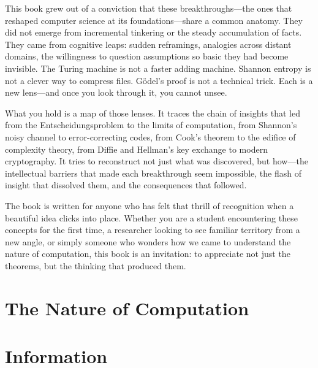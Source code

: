 \documentclass[11pt,oneside,a4paper]{book}
\theoremstyle{definition}
\theoremstyle{plain}
\theoremstyle{remark}
\begin{document}
This book grew out of a conviction that these breakthroughs---the ones that reshaped computer science at its foundations---share a common anatomy. They did not emerge from incremental tinkering or the steady accumulation of facts. They came from cognitive leaps: sudden reframings, analogies across distant domains, the willingness to question assumptions so basic they had become invisible. The Turing machine is not a faster adding machine. Shannon entropy is not a clever way to compress files. G{\"o}del's proof is not a technical trick. Each is a new lens---and once you look through it, you cannot unsee.

What you hold is a map of those lenses. It traces the chain of insights that led from the Entscheidungsproblem to the limits of computation, from Shannon's noisy channel to error-correcting codes, from Cook's theorem to the edifice of complexity theory, from Diffie and Hellman's key exchange to modern cryptography. It tries to reconstruct not just what was discovered, but how---the intellectual barriers that made each breakthrough seem impossible, the flash of insight that dissolved them, and the consequences that followed.

The book is written for anyone who has felt that thrill of recognition when a beautiful idea clicks into place. Whether you are a student encountering these concepts for the first time, a researcher looking to see familiar territory from a new angle, or simply someone who wonders how we came to understand the nature of computation, this book is an invitation: to appreciate not just the theorems, but the thinking that produced them.

\mainmatter

\part{The Nature of Computation}






\part{Information}




\end{document}
